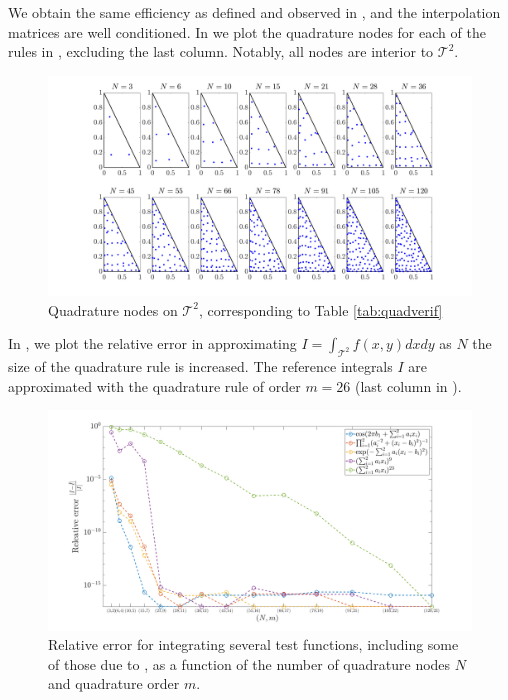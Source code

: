 We obtain the same efficiency as defined and observed in \cite{vrquad}, and the interpolation matrices are well conditioned. In  we plot the quadrature nodes for each of the rules in , excluding the last column. Notably, all nodes are interior to $\mathcal{T}^2$. 
\begin{figure}[H]
	\centering
	\includegraphics[width=1\linewidth]{./figures/triquadLeg_plot}
	\caption{Quadrature nodes on $\mathcal{T}^2$, corresponding to Table \ref{tab:quadverif}}\label{fig:triquadlegplot}
\end{figure}
In , we plot the relative error in approximating $I = \int_{\mathcal{T}^2} f(x,y) dxdy$ as $N$ the size of the quadrature rule is increased. The reference integrals $I$ are approximated with the quadrature rule of order $m=26$ (last column in ).
\begin{figure}[H]
	\centering
	\includegraphics[width=0.9\linewidth]{./figures/triquadLeg_err}
	\caption{Relative error for integrating several test functions, including some of those due to \cite{genz}, as a function of the number of quadrature nodes $N$ and quadrature order $m$.}\label{fig:triquadlegerr}
\end{figure}

